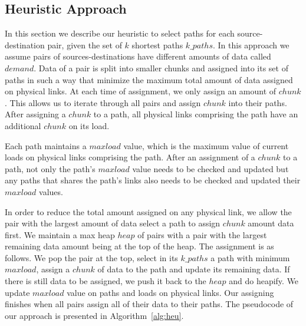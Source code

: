 \subsection{Heuristic Approach}
\label{sec:heuristic}

In this section we describe our heuristic to select paths for each source-destination pair, given the set of $k$ shortest paths $k\_paths$. In this approach we assume pairs of sources-destinations have different amounts of data called $demand$. Data of a pair is split into smaller chunks and assigned into its set of paths in such a way that minimize the maximum total amount of data assigned on physical links. At each time of assignment, we only assign an amount of $chunk$. This allows us to iterate through all pairs and assign $chunk$ into their paths. After assigning a $chunk$ to a path, all physical links comprising the path have an additional $chunk$ on its load.

Each path maintains a $maxload$ value, which is the maximum value of current loads on physical links comprising the path. After an assignment of a $chunk$ to a path, not only the path's $maxload$ value needs to be checked and updated but any paths that shares the path's links also needs to be checked and updated their $maxload$ values.

In order to reduce the total amount assigned on any physical link, we allow the pair with the largest amount of data select a path to assign $chunk$ amount data first. We maintain a max heap $heap$ of pairs with a pair with the largest remaining data amount being at the top of the heap. The assignment is as follows. We pop the pair at the top, select in its $k\_paths$ a path with minimum $maxload$, assign a $chunk$ of data to the path and update its remaining data. If there is still data to be assigned, we push it back to the $heap$ and do heapify. We update $maxload$ value on paths and loads on physical links. Our assigning finishes when all pairs assign all of their data to their paths. The pseudocode of our approach is presented in Algorithm~\ref{alg:heu}. 

